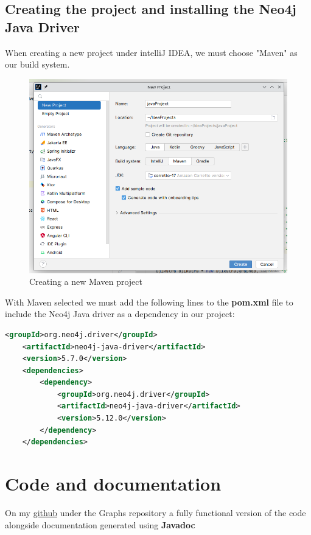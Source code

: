 \documentclass[]{report}
\begin{document}
	\section{Creating the project and installing the Neo4j Java Driver}
	When creating a new project under intelliJ IDEA, we must choose "Maven" as our build system.\\
	\begin{figure}[!htb]
		\centering
		\includegraphics[width=1\textwidth]{new_project.png}
		\caption{Creating a new Maven project}
	\end{figure}

	With Maven selected we must add the following lines to the \textbf{pom.xml} file to include the Neo4j Java driver as a dependency in our project:\\
	\begin{lstlisting}[language=xml]
	<groupId>org.neo4j.driver</groupId>
    <artifactId>neo4j-java-driver</artifactId>
    <version>5.7.0</version>
    <dependencies>
        <dependency>
            <groupId>org.neo4j.driver</groupId>
            <artifactId>neo4j-java-driver</artifactId>
            <version>5.12.0</version>
        </dependency>
    </dependencies>
	\end{lstlisting}
\newpage
\chapter{Code and documentation}
On my \href{https://github.com/abdellah2288}{github} under the Graphs repository a fully functional version of the code alongside documentation generated using \textbf{Javadoc}
\end{document}
